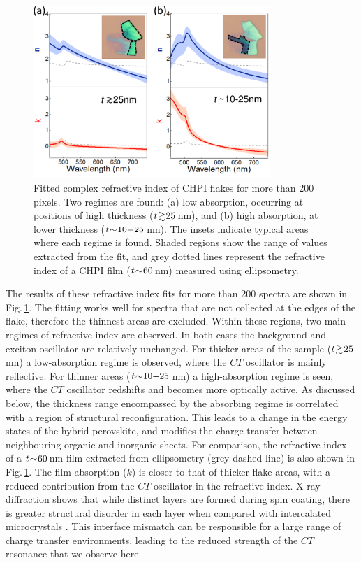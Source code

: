 \begin{figure}[ht]
\centering
\includegraphics[width=0.8\textwidth]{Fig4}
\caption[Fitted complex refractive index of CHPI flakes.]{Fitted complex refractive index of CHPI flakes for more than 200 pixels. Two regimes are found: (a) low absorption, occurring at positions of high thickness ($t\negmedspace\gtrsim\negmedspace25$\,nm), and (b) high absorption, at lower thickness ($t\negmedspace\sim\negmedspace10\negmedspace-\negmedspace25$\,nm). The insets indicate typical areas where each regime is found. Shaded regions show the range of values extracted from the fit, and grey dotted lines represent the refractive index of a CHPI film ($t\negmedspace\sim\negmedspace60$\,nm) measured using ellipsometry.}
\label{5Fig4}
\end{figure}

The results of these refractive index fits for more than 200 spectra are shown in Fig.\,\ref{5Fig4}. The fitting works well for spectra that are not collected at the edges of the flake, therefore the thinnest areas are excluded. Within these regions, two main regimes of refractive index are observed. In both cases the background and exciton oscillator are relatively unchanged. For thicker areas of the sample ($t\negmedspace\gtrsim\negmedspace25$\,nm) a low-absorption regime is observed, where the $CT$ oscillator is mainly reflective. For thinner areas ($t\negmedspace\sim\negmedspace10\negmedspace-\negmedspace25$\,nm) a high-absorption regime is seen, where the $CT$ oscillator redshifts and becomes more optically active. As discussed below, the thickness range encompassed by the absorbing regime is correlated with a region of structural reconfiguration. This leads to a change in the energy states of the hybrid perovskite, and modifies the charge transfer between neighbouring organic and inorganic sheets. For comparison, the refractive index of a $t\negmedspace\sim\negmedspace60$\,nm film extracted from ellipsometry (grey dashed line) is also shown in Fig.\,\ref{5Fig4}. The film absorption ($k$) is closer to that of thicker flake areas, with a reduced contribution from the $CT$ oscillator in the refractive index. X-ray diffraction shows that while distinct layers are formed during spin coating, there is greater structural disorder in each layer when compared with intercalated  microcrystals \cite{Saikumar2012}. This interface mismatch can be responsible for a large range of charge transfer environments, leading to the reduced strength of the $CT$ resonance that we observe here.

